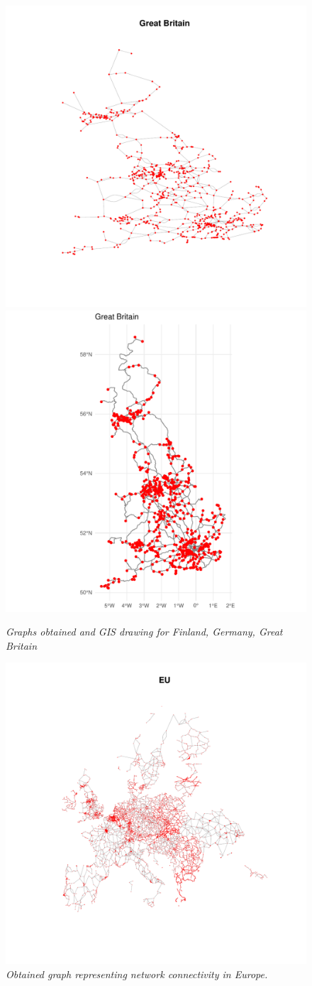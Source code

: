 \begin{figure}
	\includegraphics[width=0.34\linewidth]{images/GBGraph.pdf}
	\includegraphics[width=0.34\linewidth]{images/GBReal.pdf}
	\vspace{-5pt}
	\caption{\textit{Graphs obtained and GIS drawing for Finland, Germany, Great Britain}}
	\label{fig:country}
\end{figure}

\begin{figure}
	\centering
	\includegraphics[scale = 1]{images/Eu.pdf}
	\caption{\textit{Obtained graph representing network connectivity in Europe. }}
	\label{fig:EU}
\end{figure}

